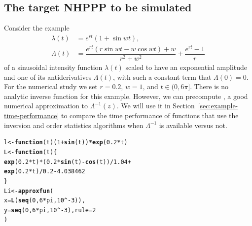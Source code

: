 \documentclass[article]{jss}\usepackage[]{graphicx}\usepackage[]{xcolor}
\makeatletter
\newcommand{\hlnum}[1]{\textcolor[rgb]{0.686,0.059,0.569}{#1}}%
\newcommand{\hlopt}[1]{\textcolor[rgb]{0,0,0}{#1}}%
\newcommand{\hlstd}[1]{\textcolor[rgb]{0.345,0.345,0.345}{#1}}%
\newcommand{\hlkwa}[1]{\textcolor[rgb]{0.161,0.373,0.58}{\textbf{#1}}}%
\newcommand{\hlkwb}[1]{\textcolor[rgb]{0.69,0.353,0.396}{#1}}%
\newcommand{\hlkwc}[1]{\textcolor[rgb]{0.333,0.667,0.333}{#1}}%
\newcommand{\hlkwd}[1]{\textcolor[rgb]{0.737,0.353,0.396}{\textbf{#1}}}%
\newenvironment{kframe}{%
 \def\at@end@of@kframe{}%
 \ifinner\ifhmode%
  \def\at@end@of@kframe{\end{minipage}}%
  \begin{minipage}{\columnwidth}%
 \fi\fi%
 \def\FrameCommand##1{\hskip\@totalleftmargin \hskip-\fboxsep
 \colorbox{shadecolor}{##1}\hskip-\fboxsep
     \hskip-\linewidth \hskip-\@totalleftmargin \hskip\columnwidth}%
 \MakeFramed {\advance\hsize-\width
   \@totalleftmargin\z@ \linewidth\hsize
   \@setminipage}}%
 {\par\unskip\endMakeFramed%
 \at@end@of@kframe}
\newenvironment{knitrout}{}{} %
\newcommand{\fct}[1]{\code{#1()}}
\makeatother
\begin{document}
\subsection{The target NHPPP to be simulated}\label{sec:illustration-target}

Consider the example
\begin{equation}\label{eq:illustration}
\begin{aligned}
\lambda(t) &= e^{rt}(1+\sin wt), \\
\Lambda(t) &= \dfrac{e^{rt}(r\sin wt - w\cos wt) + w}{r^2+w^2}+\dfrac{e^{rt}-1}{r} %
\end{aligned}
\end{equation}
of a sinusoidal intensity function $\lambda(t)$ scaled to have an exponential amplitude and one of its antiderivatives $\Lambda(t)$, with such a constant term that $\Lambda(0)=0$.  For the numerical study we set $r=0.2$, $w=1$, and $t \in (0, 6\pi]$. There is no  analytic inverse function for this example.
However, we can precompute \fct{Li}, a good numerical approximation to $\Lambda^{-1}(z)$. We will use it in Section~\ref{sec:example-time-performance} to compare the time performance of functions that use the inversion and order statistics algorithms when $\Lambda^{-1}$ is available versus not.
\begin{knitrout}
\color{fgcolor}\begin{kframe}
\begin{alltt}
\hlstd{l} \hlkwb{<-} \hlkwa{function}\hlstd{(}\hlkwc{t}\hlstd{) (}\hlnum{1} \hlopt{+} \hlkwd{sin}\hlstd{(t))} \hlopt{*} \hlkwd{exp}\hlstd{(}\hlnum{0.2} \hlopt{*} \hlstd{t)}
\hlstd{L} \hlkwb{<-} \hlkwa{function}\hlstd{(}\hlkwc{t}\hlstd{) \{}
  \hlkwd{exp}\hlstd{(}\hlnum{0.2} \hlopt{*} \hlstd{t)} \hlopt{*} \hlstd{(}\hlnum{0.2} \hlopt{*} \hlkwd{sin}\hlstd{(t)} \hlopt{-} \hlkwd{cos}\hlstd{(t))} \hlopt{/} \hlnum{1.04} \hlopt{+}
    \hlkwd{exp}\hlstd{(}\hlnum{0.2} \hlopt{*} \hlstd{t)} \hlopt{/} \hlnum{0.2} \hlopt{-} \hlnum{4.038462}
\hlstd{\}}
\hlstd{Li} \hlkwb{<-} \hlkwd{approxfun}\hlstd{(}
  \hlkwc{x} \hlstd{=} \hlkwd{L}\hlstd{(}\hlkwd{seq}\hlstd{(}\hlnum{0}\hlstd{,} \hlnum{6} \hlopt{*} \hlstd{pi,} \hlnum{10}\hlopt{^-}\hlnum{3}\hlstd{)),}
  \hlkwc{y} \hlstd{=} \hlkwd{seq}\hlstd{(}\hlnum{0}\hlstd{,} \hlnum{6} \hlopt{*} \hlstd{pi,} \hlnum{10}\hlopt{^-}\hlnum{3}\hlstd{),} \hlkwc{rule} \hlstd{=} \hlnum{2}
\hlstd{)}
\end{alltt}
\end{kframe}
\end{knitrout}
\end{document}
